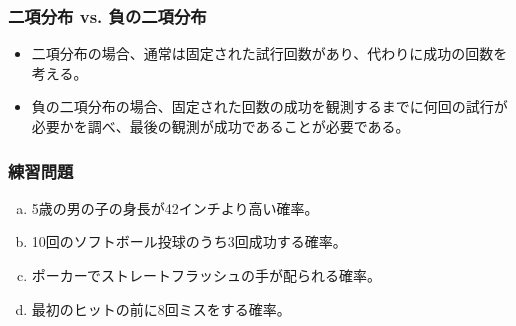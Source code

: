 
\begin{frame}
\frametitle{二項分布 vs. 負の二項分布}


\begin{itemize}

\item 二項分布の場合、通常は固定された試行回数があり、代わりに成功の回数を考える。

\item 負の二項分布の場合、固定された回数の成功を観測するまでに何回の試行が必要かを調べ、最後の観測が成功であることが必要である。

\end{itemize}

\end{frame}


\begin{frame}
\frametitle{練習問題}


\begin{enumerate}[(a)]

\item 5歳の男の子の身長が42インチより高い確率。

\item 10回のソフトボール投球のうち3回成功する確率。

\item ポーカーでストレートフラッシュの手が配られる確率。

\item 最初のヒットの前に8回ミスをする確率。


\end{enumerate}

\end{frame}
